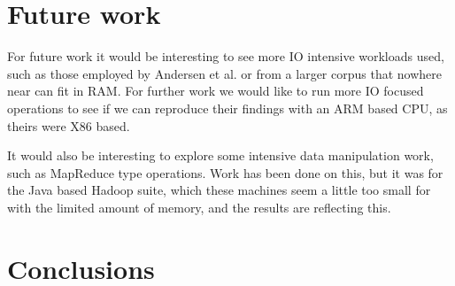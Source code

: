 
\clearpage
\section{Future work}
\label{sec:future}
For future work it would be interesting to see more IO intensive workloads used, such as those employed by Andersen et al.\cite{fawn} or from a larger corpus that nowhere near can fit in RAM.
For further work we would like to run more IO focused operations to see if we can reproduce their findings with an ARM based CPU, as theirs were X86 based.

It would also be interesting to explore some intensive data manipulation work, such as MapReduce type operations.
Work has been done on this, but it was for the Java based Hadoop suite, which these machines seem a little too small for with the limited amount of memory, and the results are reflecting this.

\clearpage
\section{Conclusions}
\label{sec:conclusion}
